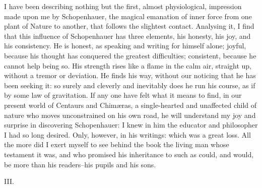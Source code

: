 I have been describing nothing but the first, almost physiological,
impression made upon me by Schopenhauer, the magical emanation of
inner force from one plant of Nature to another, that follows the
slightest contact. Analysing it, I find that this influence of
Schopenhauer has three elements, his honesty, his joy, and his
consistency. He is honest, as speaking and writing for himself alone;
joyful, because his thought has conquered the greatest difficulties;
consistent, because he cannot help being so. His strength rises like
a flame in the calm air, straight up, without a tremor or deviation.
He finds his way, without our noticing that he has been seeking it:
so surely and cleverly and inevitably does he run his course, as if
by some law of gravitation. If any one have felt what it means to
find, in our present world of Centaurs and Chimæras, a single-hearted
and unaffected child of nature who moves unconstrained on his own
road, he will understand my joy and surprise in discovering
Schopenhauer: I knew in him the educator and philosopher I had so
long desired. Only, however, in his writings: which was a great loss.
All the more did I exert myself to see behind the book the living man
whose testament it was, and who promised his inheritance to such as
could, and would, be more than his readers--his pupils and his sons.


III.

